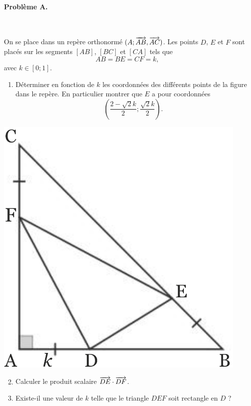 \documentclass[11pt]{article}
\begin{document}

\paragraph{Problème A.}~\\
\begin{minipage}[]{.6\textwidth}
  On se place dans un repère orthonormé $(A; \overrightarrow{AB}, \overrightarrow{AC})$. Les points
  $D$, $E$ et $F$ sont placés sur les segments $\left[ AB \right]$, $\left[
  BC \right]$ et $\left[ CA \right]$ tels que 
  \[
    AB = BE = CF = k,
  \]
  avec $k\in\left[ 0;1 \right]$.
  \begin{enumerate}
    \item Déterminer en fonction de $k$ les coordonnées des différents
      points de la figure dans le repère. En particulier montrer que $E$ a pour
      coordonnées
      $$
      \left( \frac{2-\sqrt2k}{2};\frac{\sqrt2k}{2} \right).
      $$
  \end{enumerate}
\end{minipage}
\begin{minipage}[]{.4\textwidth}
  \begin{center}
    \includegraphics[scale=.3]{pb1.png}
  \end{center}
\end{minipage}
\begin{enumerate}
    \setcounter{enumi}{1}
  \item Calculer le produit scalaire $\overrightarrow{DE}\cdot\overrightarrow{DF}$.
  \item Existe-il une valeur de $k$ telle que le triangle $DEF$ soit rectangle
    en $D$ ?
\end{enumerate}
\end{document}
